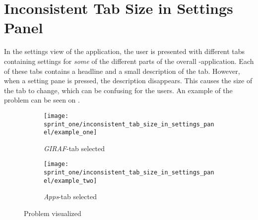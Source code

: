 
\section{Inconsistent Tab Size in Settings Panel}
\label{sec:inconsistent_tab_size_in_settings_panel}

In the settings view of the \launcher application, the user is presented with different tabs containing settings for \emph{some} of the different parts of the overall \giraf-application. Each of these tabs contains a headline and a small description of the tab. However, when a setting pane is pressed, the description disappears. This causes the size of the tab to change, which can be confusing for the users. An example of the problem can be seen on .

\begin{figure}[!htbp]
    \centering

    \begin{subfigure}[t]{0.3\textwidth}
        \texttt{[image: sprint\_one/inconsistent\_tab\_size\_in\_settings\_panel/example\_one]}
        \caption{\emph{GIRAF}-tab selected}
        \label{fig:inconsistent_tab_size_in_settings_panel_example_one}
    \end{subfigure}
    \hspace{5em} 
    \begin{subfigure}[t]{0.3\textwidth}
        \texttt{[image: sprint\_one/inconsistent\_tab\_size\_in\_settings\_panel/example\_two]}
        \caption{\emph{Apps}-tab selected}
        \label{fig:inconsistent_tab_size_in_settings_panel_example_two}
    \end{subfigure}
    
    \caption{Problem visualized}
    \label{fig:inconsistent_tab_size_in_settings_panel_example}
\end{figure}

